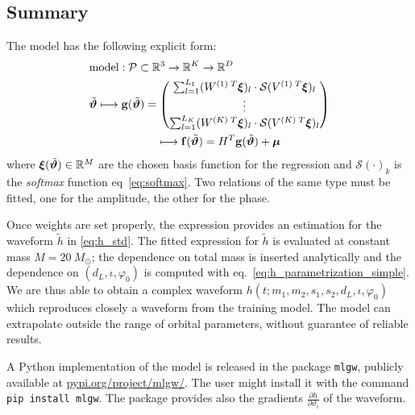 \subsection{Summary}
The model has the following explicit form:
\begin{align}
	& \textrm{model}: \mathcal{P} \subset \mathbb{R}^3 \rightarrow \mathbb{R}^K \rightarrow \mathbb{R}^D \nonumber\\
	& {\tilde{\boldsymbol{\vartheta}}}
	\longmapsto  \mathbf{g}({\tilde{\boldsymbol{\vartheta}}} ) = 
		\begin{pmatrix}
		\sum_{l=1}^{L_1} (W^{(1)\;T} \boldsymbol{\xi})_l \cdot \mathcal{S}(V^{(1)\;T}\boldsymbol{\xi})_l \\
		\vdots \\
		\sum_{l=1}^{L_K}  (W^{(K)\;T} \boldsymbol{\xi})_l \cdot \mathcal{S}(V^{(K)\;T}\boldsymbol{\xi})_l
		\end{pmatrix}
	\nonumber \\	
	& \qquad \qquad \qquad \longmapsto \mathbf{f}({\tilde{\boldsymbol{\vartheta}}} ) = H^T \mathbf{g}({\tilde{\boldsymbol{\vartheta}}} ) + \boldsymbol{\mu} \label{eq:model}
\end{align}
where ${\boldsymbol{\xi}}({\tilde{\boldsymbol{\vartheta}}}) \in \mathbb{R}^M $ are the chosen basis function for the regression and $\mathcal{S}(\cdot)_k$ is the \textit{softmax} function eq~\eqref{eq:softmax}.
Two relations of the same type must be fitted, one for the amplitude, the other for the phase.
\par
Once weights are set properly, the expression provides an estimation for the waveform $\tilde{h}$ in \eqref{eq:h_std}.
The fitted expression for  $\tilde{h}$ is evaluated at constant mass $M = \SI{20}{M_\odot}$; the dependence on total mass is inserted analytically and the dependence on $(d_L, \iota, \varphi_0)$ is computed with eq.~\eqref{eq:h_parametrization_simple}.
We are thus able to obtain a complex waveform $h(t;m_1,m_2, s_1, s_2, d_L, \iota, \varphi_0)$ which reproduces closely a waveform from the training model.
The model can extrapolate outside the range of orbital parameters, without guarantee of reliable results.
\par

A Python implementation of the model is released in the package
\texttt{mlgw}, publicly available at
\href{https://pypi.org/project/mlgw/}{pypi.org/project/mlgw/}. The
user might install it with the command \texttt{pip install mlgw}. The
package provides also the gradients $\frac{\partial h}{\partial
  \vartheta_i}$ of the waveform. 

